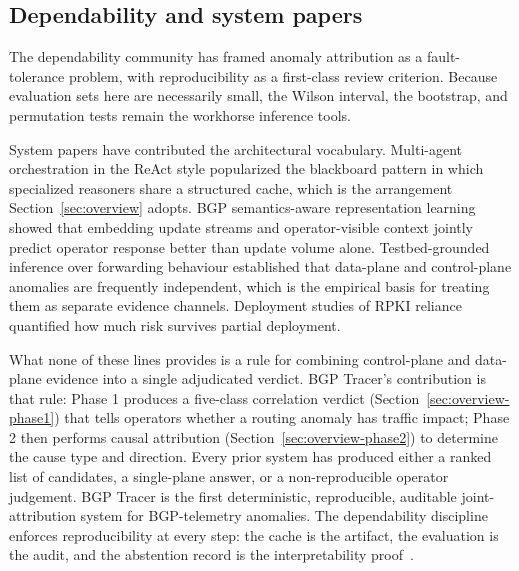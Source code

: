 \subsection{Dependability and system papers}

The dependability community has framed anomaly attribution as a fault-tolerance problem, with reproducibility as a first-class review criterion. Because evaluation sets here are necessarily small, the Wilson interval, the bootstrap, and permutation tests remain the workhorse inference tools.

System papers have contributed the architectural vocabulary. Multi-agent orchestration in the ReAct style popularized the blackboard pattern in which specialized reasoners share a structured cache, which is the arrangement Section~\ref{sec:overview} adopts. BGP semantics-aware representation learning showed that embedding update streams and operator-visible context jointly predict operator response better than update volume alone. Testbed-grounded inference over forwarding behaviour established that data-plane and control-plane anomalies are frequently independent, which is the empirical basis for treating them as separate evidence channels. Deployment studies of RPKI reliance quantified how much risk survives partial deployment.

What none of these lines provides is a rule for combining control-plane and data-plane evidence into a single adjudicated verdict. BGP Tracer's contribution is that rule: Phase 1 produces a five-class correlation verdict (Section~\ref{sec:overview-phase1}) that tells operators whether a routing anomaly has traffic impact; Phase 2 then performs causal attribution (Section~\ref{sec:overview-phase2}) to determine the cause type and direction. Every prior system has produced either a ranked list of candidates, a single-plane answer, or a non-reproducible operator judgement. BGP Tracer is the first deterministic, reproducible, auditable joint-attribution system for BGP-telemetry anomalies. The dependability discipline enforces reproducibility at every step: the cache is the artifact, the evaluation is the audit, and the abstention record is the interpretability proof~\cite{wilson-1927,efron-1979-bootstrap,phipson-2010-permutation}.

